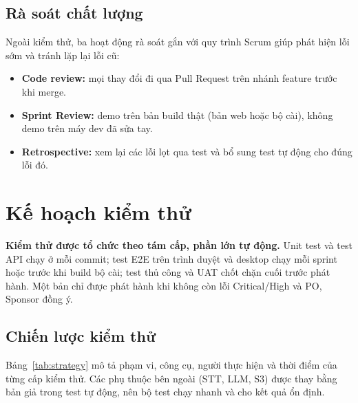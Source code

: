 \documentclass[12pt,a4paper]{report}
\begin{document}
\section{Rà soát chất lượng}

Ngoài kiểm thử, ba hoạt động rà soát gắn với quy trình Scrum giúp phát hiện lỗi sớm và tránh lặp lại lỗi cũ:
\begin{itemize}
  \item \textbf{Code review:} mọi thay đổi đi qua Pull Request trên nhánh feature trước khi merge.
  \item \textbf{Sprint Review:} demo trên bản build thật (bản web hoặc bộ cài), không demo trên máy dev đã sửa tay.
  \item \textbf{Retrospective:} xem lại các lỗi lọt qua test và bổ sung test tự động cho đúng lỗi đó.
\end{itemize}

\chapter{Kế hoạch kiểm thử}
\label{chap:testplan}

\textbf{Kiểm thử được tổ chức theo tám cấp, phần lớn tự động.} Unit test và test API chạy ở mỗi commit; test E2E
trên trình duyệt và desktop chạy mỗi sprint hoặc trước khi build bộ cài; test thủ công và UAT chốt chặn cuối trước
phát hành. Một bản chỉ được phát hành khi không còn lỗi Critical/High và PO, Sponsor đồng ý.

\section{Chiến lược kiểm thử}

Bảng~\ref{tab:strategy} mô tả phạm vi, công cụ, người thực hiện và thời điểm của từng cấp kiểm thử. Các phụ
thuộc bên ngoài (STT, LLM, S3) được thay bằng bản giả trong test tự động, nên bộ test chạy nhanh và cho kết quả
ổn định.
\end{document}
